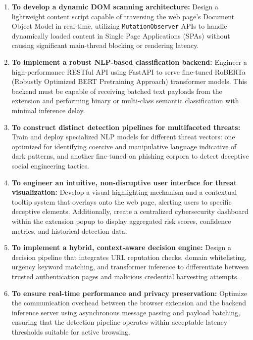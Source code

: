 \begin{enumerate}
    \item \textbf{To develop a dynamic DOM scanning architecture:} Design a lightweight content script capable of traversing the web page's Document Object Model in real-time, utilizing \texttt{MutationObserver} APIs to handle dynamically loaded content in Single Page Applications (SPAs) without causing significant main-thread blocking or rendering latency.
    \item \textbf{To implement a robust NLP-based classification backend:} Engineer a high-performance RESTful API using FastAPI to serve fine-tuned RoBERTa (Robustly Optimized BERT Pretraining Approach) transformer models. This backend must be capable of receiving batched text payloads from the extension and performing binary or multi-class semantic classification with minimal inference delay.
    \item \textbf{To construct distinct detection pipelines for multifaceted threats:} Train and deploy specialized NLP models for different threat vectors: one optimized for identifying coercive and manipulative language indicative of dark patterns, and another fine-tuned on phishing corpora to detect deceptive social engineering tactics.
    \item \textbf{To engineer an intuitive, non-disruptive user interface for threat visualization:} Develop a visual highlighting mechanism and a contextual tooltip system that overlays onto the web page, alerting users to specific deceptive elements. Additionally, create a centralized cybersecurity dashboard within the extension popup to display aggregated risk scores, confidence metrics, and historical detection data.
    \item \textbf{To implement a hybrid, context-aware decision engine:} Design a decision pipeline that integrates URL reputation checks, domain whitelisting, urgency keyword matching, and transformer inference to differentiate between trusted authentication pages and malicious credential harvesting attempts.
    \item \textbf{To ensure real-time performance and privacy preservation:} Optimize the communication overhead between the browser extension and the backend inference server using asynchronous message passing and payload batching, ensuring that the detection pipeline operates within acceptable latency thresholds suitable for active browsing.
\end{enumerate}


